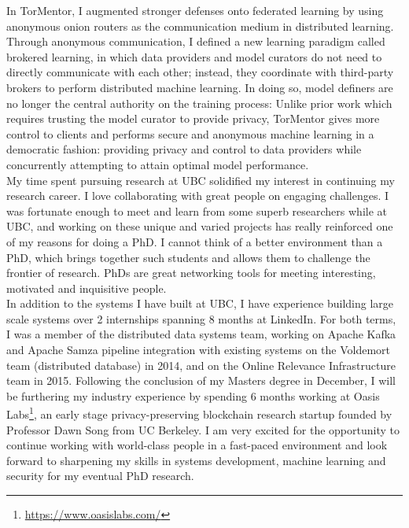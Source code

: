 \documentclass[10pt]{article} %
\begin{document}
In TorMentor, I augmented stronger defenses onto federated learning by using anonymous onion routers as the communication medium in distributed learning. Through anonymous communication, I defined a new learning paradigm called brokered learning, in which data providers and model curators do not need to directly communicate with each other; instead, they coordinate with third-party brokers to perform distributed machine learning. In doing so, model definers are no longer the central authority on the training process: Unlike prior work which requires trusting the model curator to provide privacy, TorMentor gives more control to clients and performs secure and anonymous machine learning in a democratic fashion: providing privacy and control to data providers while concurrently attempting to attain optimal model performance. \\

My time spent pursuing research at UBC solidified my interest in continuing my research career. I love collaborating with great people on engaging challenges. I was fortunate enough to meet and learn from some superb researchers while at UBC, and working on these unique and varied projects has really reinforced one of my reasons for doing a PhD. I cannot think of a better environment than a PhD, which brings together such students and allows them to challenge the frontier of research. PhDs are great networking tools for meeting interesting, motivated and inquisitive people. \\

In addition to the systems I have built at UBC, I have experience building large scale systems over 2 internships spanning 8 months at LinkedIn. For both terms, I was a member of the distributed data systems team, working on Apache Kafka and Apache Samza pipeline integration with existing systems on the Voldemort team (distributed database) in 2014, and on the Online Relevance Infrastructure team in 2015. Following the conclusion of my Masters degree in December, I will be furthering my industry experience by spending 6 months working at Oasis Labs\footnote{\url{https://www.oasislabs.com/}}, an early stage privacy-preserving blockchain research startup founded by Professor Dawn Song from UC Berkeley. I am very excited for the opportunity to continue working with world-class people in a fast-paced environment and look forward to sharpening my skills in systems development, machine learning and security for my eventual PhD research. \\
\end{document}
